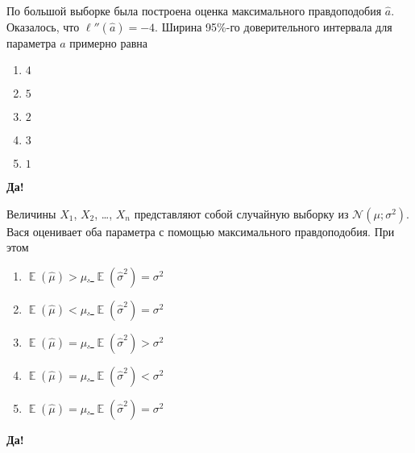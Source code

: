 \documentclass[t]{beamer}
\DeclareMathOperator{\E}{\mathbb{E}}
\newcommand{\cN}{\mathcal{N}}
\begin{document}
 \begin{frame} \label{17-Yes} 
\begin{block}{17} 

   По большой выборке была построена оценка  максимального правдоподобия $\hat a$. Оказалось, что $\ell''(\hat a) = -4$. Ширина 95\%-го доверительного интервала для параметра $a$ примерно равна


 \end{block} 
\begin{enumerate} 
\item[] \hyperlink{17-No}{\beamergotobutton{} $4$}
\item[] \hyperlink{17-No}{\beamergotobutton{} $5$}
\item[] \hyperlink{17-Yes}{\beamergotobutton{} $2$}
\item[] \hyperlink{17-No}{\beamergotobutton{} $3$}
\item[] \hyperlink{17-No}{\beamergotobutton{} $1$}
\end{enumerate} 

 \textbf{Да!} 
 \hyperlink{18}{}\end{frame} 


 \begin{frame} \label{18-Yes} 
\begin{block}{18} 

  Величины $X_1$, $X_2$, \ldots, $X_n$ представляют собой случайную выборку из $\cN(\mu; \sigma^2)$. Вася оценивает оба параметра с помощью максимального правдоподобия. При этом


 \end{block} 
\begin{enumerate} 
\item[] \hyperlink{18-No}{\beamergotobutton{} $\E(\hat \mu)>\mu$, $\E(\hat\sigma^2) = \sigma^2$}
\item[] \hyperlink{18-No}{\beamergotobutton{} $\E(\hat \mu)<\mu$, $\E(\hat\sigma^2) = \sigma^2$}
\item[] \hyperlink{18-No}{\beamergotobutton{} $\E(\hat \mu)=\mu$, $\E(\hat\sigma^2) > \sigma^2$}
\item[] \hyperlink{18-Yes}{\beamergotobutton{} $\E(\hat \mu)=\mu$, $\E(\hat\sigma^2) < \sigma^2$}
\item[] \hyperlink{18-No}{\beamergotobutton{} $\E(\hat \mu)=\mu$, $\E(\hat\sigma^2) = \sigma^2$}
\end{enumerate} 

 \textbf{Да!} 
 \hyperlink{19}{}\end{frame} 
\end{document}

